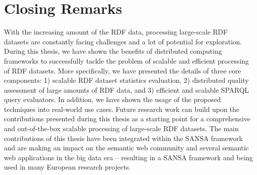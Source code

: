 \section{Closing Remarks}
With the increasing amount of the \gls{RDF} data, processing large-scale \gls{RDF} datasets are constantly facing challenges and a lot of potential for exploration.
During this thesis, we have shown the benefits of distributed computing frameworks to successfully tackle the problem of scalable and efficient processing of \gls{RDF} datasets.
More specifically, we have presented the details of three core components: 1) scalable \gls{RDF} dataset statistics evaluation, 2) distributed quality assessment of large amounts of \gls{RDF} data, and 3) efficient and scalable \gls{SPARQL} query evaluators.
In addition, we have shown the usage of the proposed techniques into real-world use cases.
Future research work can build upon the contributions presented during this thesis as a starting point for a comprehensive and out-of-the-box scalable processing of large-scale \gls{RDF} datasets.
The main contributions of this thesis have been integrated within the SANSA framework and are making an impact on the semantic web community and several semantic web applications in the big data era -- resulting in a SANSA framework and being used in many European research projects.


